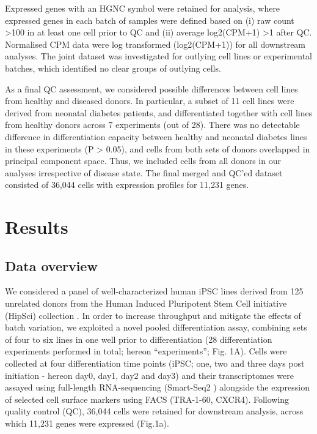 Expressed genes with an HGNC symbol were retained for analysis, where expressed genes in each batch of samples were defined based on (i) raw count >100 in at least one cell prior to QC and (ii) average log2(CPM+1) >1 after QC. 
Normalised CPM data were log transformed (log2(CPM+1)) for all downstream analyses. 
The joint dataset was investigated for outlying cell lines or experimental batches, which identified no clear groups of outlying cells. 

As a final QC assessment, we considered possible differences between cell lines from healthy and diseased donors. 
In particular, a subset of 11 cell lines were derived from neonatal diabetes patients, and differentiated together with cell lines from healthy donors across 7 experiments (out of 28). 
There was no detectable difference in differentiation capacity between healthy and neonatal diabetes lines in these experiments (P > 0.05), and cells from both sets of donors overlapped in principal component space. 
Thus, we included cells from all donors in our analyses irrespective of disease state.
The final merged and QC’ed dataset consisted of 36,044 cells with expression profiles for 11,231 genes.


\section{Results}

\subsection{Data overview}

 We considered a panel of well-characterized human iPSC lines derived from 125 unrelated donors from the Human Induced Pluripotent Stem Cell initiative (HipSci) collection \cite{kilpinen2017common}. 
 In order to increase throughput and mitigate the effects of batch variation, we exploited a novel pooled differentiation assay, combining sets of four to six lines in one well prior to differentiation (28 differentiation experiments performed in total; hereon “experiments”; Fig. 1A). 
 Cells were collected at four differentiation time points (iPSC; one, two and three days post initiation - hereon day0, day1, day2 and day3) and their transcriptomes were assayed using full-length RNA-sequencing (Smart-Seq2 \cite{picelli2013smart}) alongside the expression of selected cell surface markers using FACS (TRA-1-60, CXCR4). 
 Following quality control (QC), 36,044 cells were retained for downstream analysis, across which 11,231 genes were expressed (Fig.1a).
 
